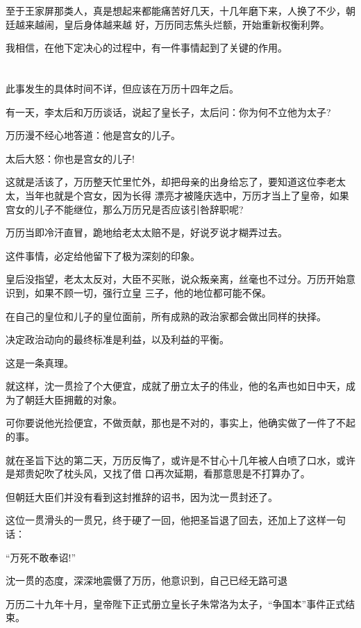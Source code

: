 \documentclass[11pt,a4paper,onecolumn]{article}
\begin{document}
至于王家屏那类人，真是想起来都能痛苦好几天，十几年磨下来，人换了不少，朝廷越来越闹，皇后身体越来越
好，万历同志焦头烂额，开始重新权衡利弊。

我相信，在他下定决心的过程中，有一件事情起到了关键的作用。

\section[\thesection]{}

此事发生的具体时间不详，但应该在万历十四年之后。

有一天，李太后和万历谈话，说起了皇长子，太后问：你为何不立他为太子?

万历漫不经心地答道：他是宫女的儿子。

太后大怒：你也是宫女的儿子!

这就是活该了，万历整天忙里忙外，却把母亲的出身给忘了，要知道这位李老太太，当年也就是个宫女，因为长得
漂亮才被隆庆选中，万历才当上了皇帝，如果宫女的儿子不能继位，那么万历兄是否应该引咎辞职呢?

万历当即冷汗直冒，跪地给老太太赔不是，好说歹说才糊弄过去。

这件事情，必定给他留下了极为深刻的印象。

皇后没指望，老太太反对，大臣不买账，说众叛亲离，丝毫也不过分。万历开始意识到，如果不顾一切，强行立皇
三子，他的地位都可能不保。

在自己的皇位和儿子的皇位面前，所有成熟的政治家都会做出同样的抉择。

决定政治动向的最终标准是利益，以及利益的平衡。

这是一条真理。

就这样，沈一贯捡了个大便宜，成就了册立太子的伟业，他的名声也如日中天，成为了朝廷大臣拥戴的对象。

可你要说他光捡便宜，不做贡献，那也是不对的，事实上，他确实做了一件了不起的事。

就在圣旨下达的第二天，万历反悔了，或许是不甘心十几年被人白喷了口水，或许是郑贵妃吹了枕头风，又找了借
口再次延期，看那意思是不打算办了。

但朝廷大臣们并没有看到这封推辞的诏书，因为沈一贯封还了。

这位一贯滑头的一贯兄，终于硬了一回，他把圣旨退了回去，还加上了这样一句话：

``万死不敢奉诏!''

沈一贯的态度，深深地震慑了万历，他意识到，自己已经无路可退

万历二十九年十月，皇帝陛下正式册立皇长子朱常洛为太子，``争国本''事件正式结束。
\end{document}
